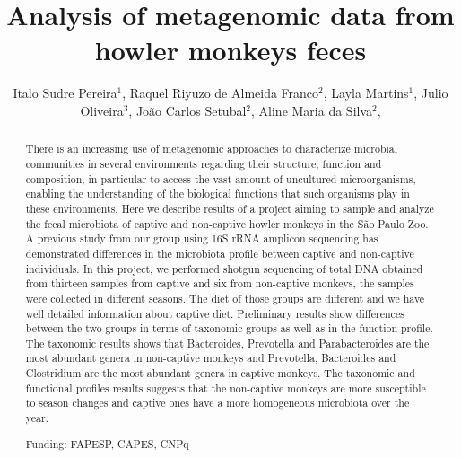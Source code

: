 \documentclass[twoside]{article}
\title{\vspace{-15mm}\fontsize{24pt}{10pt}\selectfont\textbf{ Analysis of metagenomic data from howler monkeys feces }} %
\author{ Italo Sudre Pereira$^{1}$, Raquel Riyuzo de Almeida Franco$^{2}$, Layla Martins$^{1}$, Julio Oliveira$^{3}$, João Carlos Setubal$^{2}$, Aline Maria da Silva$^{2}$, }
\affil{ 1 Universidade de São Paulo

2 USP

3 Universidade Federal de São Paulo

 }
\date{}
\begin{document}
  
  
  \maketitle %
  
  
  \thispagestyle{fancy} %
  
  
  \begin{abstract}
  There is an increasing use of metagenomic approaches to characterize microbial communities in several environments regarding their structure, function and composition, in particular to access the vast amount of uncultured microorganisms, enabling the understanding of the biological functions that such organisms play in these environments. Here we describe results of a project aiming to sample and analyze the fecal microbiota of captive and non-captive howler monkeys in the S\~ao Paulo Zoo. A previous study from our group using 16S rRNA amplicon sequencing has demonstrated differences in the microbiota profile between captive and non-captive individuals. In this project, we performed shotgun sequencing of total DNA obtained from thirteen samples from captive and six from non-captive monkeys, the samples were collected in different seasons. The diet of those groups are different and we have well detailed information about captive diet. Preliminary results show differences between the two groups in terms of taxonomic groups as well as in the function profile. The taxonomic results shows that Bacteroides, Prevotella and Parabacteroides are the most abundant genera in non-captive monkeys and Prevotella, Bacteroides and Clostridium are the most abundant genera in captive monkeys. The taxonomic and functional profiles results suggests that the non-captive monkeys are more susceptible to season changes and captive ones have a more homogeneous microbiota over the year.
  
  Funding: FAPESP, CAPES, CNPq \\ 
  \end{abstract}
  
\end{document}
